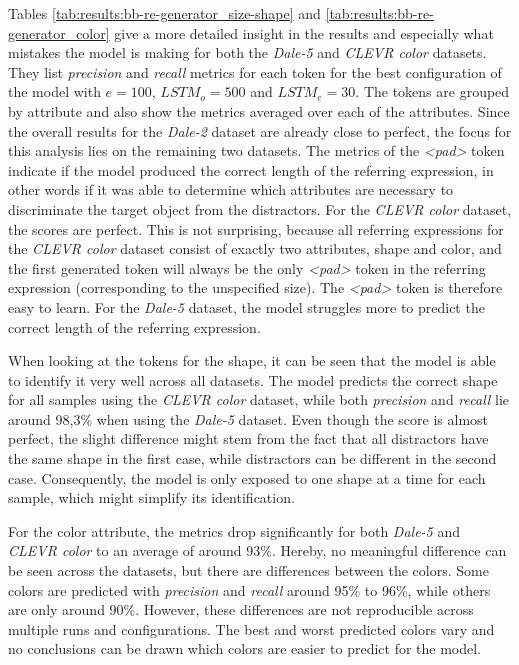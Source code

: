 Tables \ref{tab:results:bb-re-generator_size-shape} and \ref{tab:results:bb-re-generator_color} give a more detailed insight in the results and especially what mistakes the model is making for both the \emph{Dale-5} and \emph{CLEVR color} datasets.
They list \emph{precision} and \emph{recall} metrics for each token for the best configuration of the model with $e=100$, $LSTM_o=500$ and $LSTM_e=30$.
The tokens are grouped by attribute and also show the metrics averaged over each of the attributes.
Since the overall results for the \emph{Dale-2} dataset are already close to perfect, the focus for this analysis lies on the remaining two datasets.
The metrics of the \emph{<pad>} token indicate if the model produced the correct length of the referring expression, in other words if it was able to determine which attributes are necessary to discriminate the target object from the distractors.
For the \emph{CLEVR color} dataset, the scores are perfect.
This is not surprising, because all referring expressions for the \emph{CLEVR color} dataset consist of exactly two attributes, shape and color, and the first generated token will always be the only \emph{<pad>} token in the referring expression (corresponding to the unspecified size).
The \emph{<pad>} token is therefore easy to learn.
For the \emph{Dale-5} dataset, the model struggles more to predict the correct length of the referring expression.

When looking at the tokens for the shape, it can be seen that the model is able to identify it very well across all datasets.
The model predicts the correct shape for all samples using the \emph{CLEVR color} dataset, while both \emph{precision} and \emph{recall} lie around 98,3\% when using the \emph{Dale-5} dataset.
Even though the score is almost perfect, the slight difference might stem from the fact that all distractors have the same shape in the first case, while distractors can be different in the second case.
Consequently, the model is only exposed to one shape at a time for each sample, which might simplify its identification.

For the color attribute, the metrics drop significantly for both \emph{Dale-5} and \emph{CLEVR color} to an average of around 93\%.
Hereby, no meaningful difference can be seen across the datasets, but there are differences between the colors.
Some colors are predicted with \emph{precision} and \emph{recall} around 95\% to 96\%, while others are only around 90\%.
However, these differences are not reproducible across multiple runs and configurations.
The best and worst predicted colors vary and no conclusions can be drawn which colors are easier to predict for the model.

